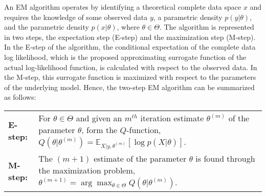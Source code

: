 \documentclass[12pt, draftclsnofoot, onecolumn]{IEEEtran}
\theoremstyle{plain}
\begin{document}
An EM algorithm operates by identifying a theoretical complete data space $x$ and requires the knowledge of some observed data $y$, a parametric density $p(y|\theta)$, and the parametric density $p(x|\theta)$, where $\theta \in \Theta$. The algorithm is represented in two steps, the expectation step (E-step) and the maximization step (M-step). In the E-step of the algorithm, the conditional expectation of the complete data log likelihood, which is the proposed approximating surrogate function of the actual log-likelihood function, is calculated with respect to the observed data. %
In the M-step, this surrogate function is maximized with respect to the parameters of the underlying model. Hence, the two-step EM algorithm can be summarized as follows:
\begin{center}
    \begin{tabular}{ | p{2cm} | p{13.9cm} |}
    \hline
    \multicolumn{1}{|l}{\textbf{E-step:}} & For $\theta\in\Theta$ and given an $m^{th}$ iteration estimate $\theta^{(m)}$ of the parameter $\theta$, form the $Q$-function, $Q(\theta|\theta^{(m)})=\mathbb{E}_{X|y,\theta^{(m)}}[\log p(X|\theta)]$. \\ 
    \multicolumn{1}{|l}{\textbf{M-step:}} & The $(m+1)$ estimate of the parameter $\theta$ is found through the maximization problem, $\theta^{(m+1)}=\arg \max_{\theta\in\Theta}{Q(\theta|\theta^{(m)})}$.
		\\ \hline
    \end{tabular}
\end{center}
\fi
\vspace{-.15in}
\end{document}
